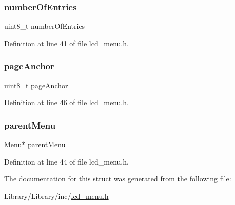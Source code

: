 \mbox{\label{struct_menu___a4f106d3cb8ba7865c1972731deaf6d45}} 
\subsubsection{\texorpdfstring{number\+Of\+Entries}{numberOfEntries}}
{\footnotesize\ttfamily uint8\+\_\+t number\+Of\+Entries}



Definition at line 41 of file lcd\+\_\+menu.\+h.

\mbox{\label{struct_menu___ade32708e7d25a18c52ef9ea43022157e}} 
\subsubsection{\texorpdfstring{page\+Anchor}{pageAnchor}}
{\footnotesize\ttfamily uint8\+\_\+t page\+Anchor}



Definition at line 46 of file lcd\+\_\+menu.\+h.

\mbox{\label{struct_menu___af153fe0e8d7a80232bc537bd3d99d14a}} 
\subsubsection{\texorpdfstring{parent\+Menu}{parentMenu}}
{\footnotesize\ttfamily \mbox{\hyperlink{lcd__menu_8h_afe0ab1c0311f677767b1588296b0f563}{Menu}}$\ast$ parent\+Menu}



Definition at line 44 of file lcd\+\_\+menu.\+h.



The documentation for this struct was generated from the following file\+:\begin{DoxyCompactItemize}
\item 
Library/\+Library/inc/\mbox{\hyperlink{lcd__menu_8h}{lcd\+\_\+menu.\+h}}\end{DoxyCompactItemize}
